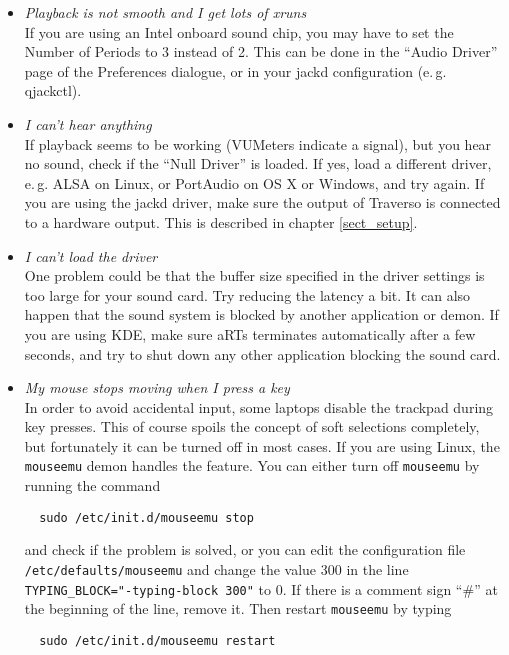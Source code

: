 \begin{itemize}
 \item \textit{Playback is not smooth and I get lots of xruns}\\
  If you are using an Intel onboard sound chip, you may have to set the Number of Periods to 3 instead of 2. This can be done in the ``Audio Driver'' page of the Preferences dialogue, or in your jackd configuration (e.\,g. qjackctl).

 \item \textit{I can't hear anything}\\
  If playback seems to be working (VUMeters indicate a signal), but you hear no sound, check if the ``Null Driver'' is loaded. If yes, load a different driver, e.\,g. ALSA on Linux, or PortAudio on OS X or Windows, and try again. If you are using the jackd driver, make sure the output of Traverso is connected to a hardware output. This is described in chapter \ref{sect_setup}.

 \item \textit{I can't load the driver}\\
  One problem could be that the buffer size specified in the driver settings is too large for your sound card. Try reducing the latency a bit. It can also happen that the sound system is blocked by another application or demon. If you are using KDE, make sure aRTs terminates automatically after a few seconds, and try to shut down any other application blocking the sound card.

 \item \textit{My mouse stops moving when I press a key}\\
  In order to avoid accidental input, some laptops disable the trackpad during key presses. This of course spoils the concept of soft selections completely, but fortunately it can be turned off in most cases. If you are using Linux, the \texttt{mouseemu} demon handles the feature. You can either turn off \texttt{mouseemu} by running the command 
  \begin{verbatim}
  sudo /etc/init.d/mouseemu stop
  \end{verbatim}
  and check if the problem is solved, or you can edit the configuration file \texttt{/etc/defaults/mouseemu} and change the value 300 in the line \texttt{TYPING\_BLOCK="-typing-block 300"} to 0. If there is a comment sign ``\#'' at the beginning of the line, remove it. Then restart \texttt{mouseemu} by typing
  \begin{verbatim}
  sudo /etc/init.d/mouseemu restart
  \end{verbatim}


\end{itemize}
